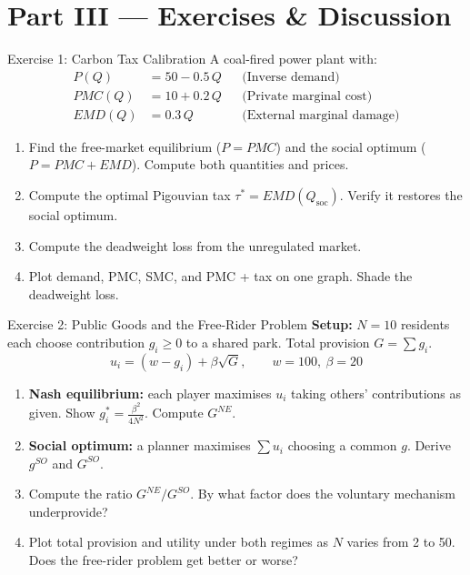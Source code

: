 \documentclass[aspectratio=169, 10pt]{beamer}
\begin{document}
\section{Part III --- Exercises \& Discussion}

\begin{frame}{Exercise 1: Carbon Tax Calibration}
A coal-fired power plant with:
\vspace{0.3em}
\begin{align*}
  P(Q) &= 50 - 0.5\,Q & &\text{(Inverse demand)} \\
  PMC(Q) &= 10 + 0.2\,Q & &\text{(Private marginal cost)} \\
  EMD(Q) &= 0.3\,Q & &\text{(External marginal damage)}
\end{align*}
\vspace{0.3em}
\begin{enumerate}
  \item[(a)] Find the free-market equilibrium ($P = PMC$) and the social
        optimum ($P = PMC + EMD$). Compute both quantities and prices.
  \item[(b)] Compute the optimal Pigouvian tax $\tau^* = EMD(Q_{\text{soc}})$.
        Verify it restores the social optimum.
  \item[(c)] Compute the deadweight loss from the unregulated market.
  \item[(d)] Plot demand, PMC, SMC, and PMC + tax on one graph.
        Shade the deadweight loss.
\end{enumerate}
\end{frame}

\begin{frame}{Exercise 2: Public Goods and the Free-Rider Problem}
\textbf{Setup:} $N = 10$ residents each choose contribution $g_i \geq 0$
to a shared park. Total provision $G = \sum g_i$.
\[
  u_i = (w - g_i) + \beta\sqrt{G}, \qquad w = 100,\ \beta = 20
\]

\begin{enumerate}
  \item[(a)] \textbf{Nash equilibrium:} each player maximises $u_i$ taking
        others' contributions as given. Show
        $g_i^* = \frac{\beta^2}{4N^2}$. Compute $G^{NE}$.
  \item[(b)] \textbf{Social optimum:} a planner maximises $\sum u_i$
        choosing a common $g$. Derive $g^{SO}$ and $G^{SO}$.
  \item[(c)] Compute the ratio $G^{NE}/G^{SO}$. By what factor does the
        voluntary mechanism underprovide?
  \item[(d)] Plot total provision and utility under both regimes as
        $N$ varies from 2 to 50. Does the free-rider problem get better
        or worse?
\end{enumerate}
\end{frame}
\end{document}
